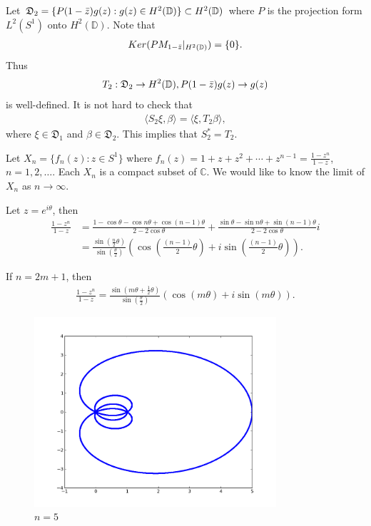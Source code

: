 \documentclass[a4paper,10pt]{amsart}
\newcommand{\DDD}{\mathfrak D}
\newcommand{\C}{\mathbb C} %
\newcommand{\Hd}{H^{2}(\mathbb{D})}
\begin{document}
Let $\DDD_2 = \{P(1-\Bar{z})g(z) : g(z) \in \Hd \} \subset \Hd$ where
$P$ is the projection form $L^{2}(S^1)$ onto $\Hd$. Note that
\begin{align*}
    Ker(PM_{1-\Bar{z}}|_{\Hd}) = \{0\}.
\end{align*}
Thus
\begin{align*}
    T_2:  \DDD_2 \to \Hd, 
    P(1-\Bar{z})g(z) \to g(z)
\end{align*}
is well-defined.
It is not hard to check that 
\begin{align*}
   \langle S_2 \xi , \beta \rangle = \langle \xi, T_2 \beta \rangle, 
\end{align*}
where $\xi \in \DDD_1$ and $\beta \in \DDD_2$. This implies that 
$S_{2}^* = T_2$.

Let $X_{n} = \{f_n(z) : z \in S^{1} \}$ where
$f_n(z) = 1 + z + z^2 + \cdots + z^{n-1} = \frac{1-z^{n}}{1-z}$, 
$n = 1, 2, \ldots$. Each $X_n$ is a compact subset of $\C$. We would like 
to know the limit of $X_n$ as $n \to \infty$.

Let $z = e^{i\theta}$, then
\begin{align*}
    \frac{1-z^{n}}{1-z} &= 
    \frac{1-\cos \theta - \cos n\theta + \cos(n-1)\theta}
    {2-2\cos \theta}
    + \frac{\sin \theta - \sin n\theta + \sin(n-1)\theta}
    {2-2\cos \theta} i \\
    &= \frac{\sin (\frac{n}{2}\theta)}
       {\sin (\frac{\theta}{2})} \left (
       \cos (\frac{(n-1)}{2}\theta) + i\sin (\frac{(n-1)}{2}\theta) \right).
\end{align*}

If $n = 2m + 1$, then
\begin{align*}
    \frac{1-z^{n}}{1-z} = 
    \frac{\sin (m\theta + \frac{1}{2}\theta)}
       {\sin (\frac{\theta}{2})} \left (
       \cos (m\theta) + i\sin (m\theta) \right).
\end{align*}

\begin{figure}[H]
    \centering
    \includegraphics[width=0.8\textwidth]{zn5.png}
    \caption{$n=5$}
\end{figure}
\end{document}
